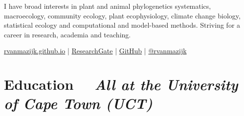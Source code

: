\documentclass[10pt]{article}
\begin{document}


\bigskip

I have broad interests in plant and animal phylogenetics systematics, 
macroecology, community ecology, plant ecophysiology, climate change biology, 
statistical ecology and computational and model-based methods. Striving for a 
career in research, academia and teaching.

\bigskip




\href{https://rvanmazijk.github.io/}{rvanmazijk.github.io} |
  \href{https://www.researchgate.net/profile/Ruan_Van_Mazijk/}{ResearchGate} |
  \href{https://github.com/rvanmazijk/}{GitHub} |
  \href{https://twitter.com/rvanmazijk/}{@rvanmazijk}






\hrulefill

\section*{Education %
  ~~{\small \textmd{\textit{All at the University of Cape Town (UCT)}}}}



\bigskip
\end{document}
